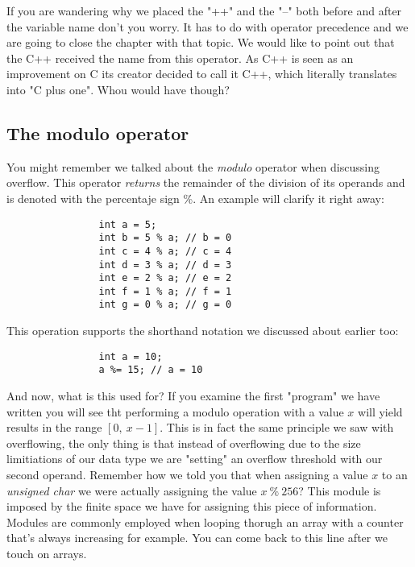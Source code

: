 \documentclass[12pt]{book}
\begin{document}
              If you are wandering why we placed the "++" and the "--" both before and after the variable name don't you worry. It has to do with operator precedence and we are going to close the chapter with that topic. We would like to point out that the C++ received the name from this operator. As C++ is seen as an improvement on C its creator decided to call it C++, which literally translates into "C plus one". Whou would have though?

            \subsection{The modulo operator}
              You might remember we talked about the \textit{modulo} operator when discussing overflow. This operator \textit{returns} the remainder of the division of its operands and is denoted with the percentaje sign \%. An example will clarify it right away:

              \begin{verbatim}
                int a = 5;
                int b = 5 % a; // b = 0
                int c = 4 % a; // c = 4
                int d = 3 % a; // d = 3
                int e = 2 % a; // e = 2
                int f = 1 % a; // f = 1
                int g = 0 % a; // g = 0
              \end{verbatim}

              This operation supports the shorthand notation we discussed about earlier too:

              \begin{verbatim}
                int a = 10;
                a %= 15; // a = 10
              \end{verbatim}

              And now, what is this used for? If you examine the first "program" we have written you will see tht performing a modulo operation with a value $x$ will yield results in the range $[0,\ x - 1]$. This is in fact the same principle we saw with overflowing, the only thing is that instead of overflowing due to the size limitiations of our data type we are "setting" an overflow threshold with our second operand. Remember how we told you that when assigning a value $x$ to an \textit{unsigned char} we were actually assigning the value $x\ \%\ 256$? This module is imposed by the finite space we have for assigning this piece of information. Modules are commonly employed when looping thorugh an array with a counter that's always increasing for example. You can come back to this line after we touch on arrays.
\end{document}
